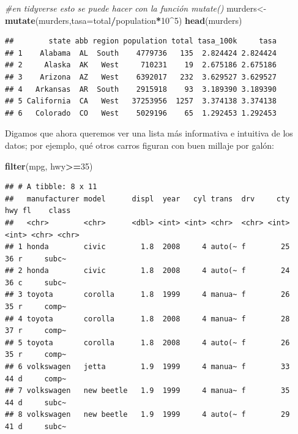 \documentclass[
]{article}
\newenvironment{Shaded}{\begin{snugshade}}{\end{snugshade}}
\newcommand{\AttributeTok}[1]{\textcolor[rgb]{0.13,0.29,0.53}{#1}}
\newcommand{\CommentTok}[1]{\textcolor[rgb]{0.56,0.35,0.01}{\textit{#1}}}
\newcommand{\DecValTok}[1]{\textcolor[rgb]{0.00,0.00,0.81}{#1}}
\newcommand{\FunctionTok}[1]{\textcolor[rgb]{0.13,0.29,0.53}{\textbf{#1}}}
\newcommand{\NormalTok}[1]{#1}
\newcommand{\OtherTok}[1]{\textcolor[rgb]{0.56,0.35,0.01}{#1}}
\newcommand{\SpecialCharTok}[1]{\textcolor[rgb]{0.81,0.36,0.00}{\textbf{#1}}}
\begin{document}
\begin{Shaded}
\begin{Highlighting}[]
\CommentTok{\#en tidyverse esto se puede hacer con la función mutate()}
\NormalTok{murders}\OtherTok{\textless{}{-}}\FunctionTok{mutate}\NormalTok{(murders,}\AttributeTok{tasa=}\NormalTok{total}\SpecialCharTok{/}\NormalTok{population}\SpecialCharTok{*}\DecValTok{10}\SpecialCharTok{\^{}}\DecValTok{5}\NormalTok{)}
\FunctionTok{head}\NormalTok{(murders)}
\end{Highlighting}
\end{Shaded}

\begin{verbatim}
##        state abb region population total tasa_100k     tasa
## 1    Alabama  AL  South    4779736   135  2.824424 2.824424
## 2     Alaska  AK   West     710231    19  2.675186 2.675186
## 3    Arizona  AZ   West    6392017   232  3.629527 3.629527
## 4   Arkansas  AR  South    2915918    93  3.189390 3.189390
## 5 California  CA   West   37253956  1257  3.374138 3.374138
## 6   Colorado  CO   West    5029196    65  1.292453 1.292453
\end{verbatim}

Digamos que ahora queremos ver una lista más informativa e intuitiva de
los datos; por ejemplo, qué otros carros figuran con buen millaje por
galón:

\begin{Shaded}
\begin{Highlighting}[]
\FunctionTok{filter}\NormalTok{(mpg, hwy}\SpecialCharTok{\textgreater{}=}\DecValTok{35}\NormalTok{) }
\end{Highlighting}
\end{Shaded}

\begin{verbatim}
## # A tibble: 8 x 11
##   manufacturer model      displ  year   cyl trans  drv     cty   hwy fl    class
##   <chr>        <chr>      <dbl> <int> <int> <chr>  <chr> <int> <int> <chr> <chr>
## 1 honda        civic        1.8  2008     4 auto(~ f        25    36 r     subc~
## 2 honda        civic        1.8  2008     4 auto(~ f        24    36 c     subc~
## 3 toyota       corolla      1.8  1999     4 manua~ f        26    35 r     comp~
## 4 toyota       corolla      1.8  2008     4 manua~ f        28    37 r     comp~
## 5 toyota       corolla      1.8  2008     4 auto(~ f        26    35 r     comp~
## 6 volkswagen   jetta        1.9  1999     4 manua~ f        33    44 d     comp~
## 7 volkswagen   new beetle   1.9  1999     4 manua~ f        35    44 d     subc~
## 8 volkswagen   new beetle   1.9  1999     4 auto(~ f        29    41 d     subc~
\end{verbatim}
\end{document}
